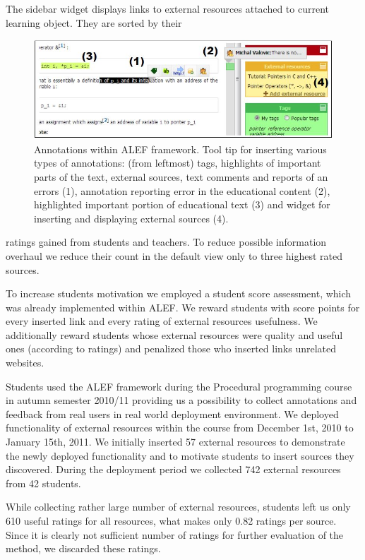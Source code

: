 \documentclass[a4, conference]{IEEEtran}
\begin{document}
The sidebar widget displays links to external resources attached to current learning object. They are sorted by their 
\begin{figure}
\centering
\includegraphics [width=\textwidth]{Figure3.jpg}
\caption{Annotations within ALEF framework. Tool tip for inserting various types of annotations: (from leftmost) tags, highlights of important parts of the text, external sources, text comments and reports of an errors (1), annotation reporting error in the educational content (2), highlighted important portion of educational text (3) and widget for inserting and displaying external sources (4).}
\label{obrazok3}
\end{figure}
ratings gained from students and teachers. To reduce possible information overhaul we reduce their count in the default view only to three highest rated sources.

To increase students\textsc{} motivation we employed a student score assessment, which was already implemented within ALEF. We reward students with score points for every inserted link and every rating of external resources usefulness. We additionally reward students whose external resources were quality and useful ones (according to ratings) and penalized those who inserted links unrelated websites.

Students used the ALEF framework during the Procedural programming course in autumn semester 2010/11 providing us a possibility to collect annotations and feedback from real users in real world deployment environment. We deployed functionality of external resources within the course from December 1st, 2010 to January 15th, 2011. We initially inserted 57 external resources to demonstrate the newly deployed functionality and to motivate students to insert sources they discovered. During the deployment period we collected 742 external resources from 42 students.

While collecting rather large number of external resources, students left us only 610 useful ratings for all resources, what makes only 0.82 ratings per source. Since it is clearly not sufficient number of ratings for further evaluation of the method, we discarded these ratings.
\end{document}
